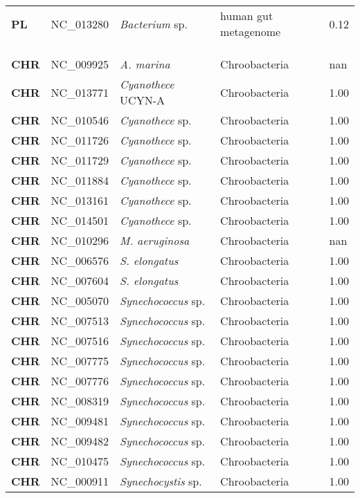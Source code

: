 \begin{adjustwidth}{-3cm}{2cm}
{\begin{supertabular}{>{\bfseries}l|p{0.1\textwidth}p{0.14\textwidth}l|l}
PL & NC\_013280 & \textit{Bacterium} sp. & human gut metagenome & 0.12\\
\\
\\
\hline\\
CHR & NC\_009925 & \textit{A. marina} & Chroobacteria & nan\\
CHR & NC\_013771 & \textit{Cyanothece} UCYN-A & Chroobacteria & 1.00\\
CHR & NC\_010546 & \textit{Cyanothece} sp. & Chroobacteria & 1.00\\
CHR & NC\_011726 & \textit{Cyanothece} sp. & Chroobacteria & 1.00\\
CHR & NC\_011729 & \textit{Cyanothece} sp. & Chroobacteria & 1.00\\
CHR & NC\_011884 & \textit{Cyanothece} sp. & Chroobacteria & 1.00\\
CHR & NC\_013161 & \textit{Cyanothece} sp. & Chroobacteria & 1.00\\
CHR & NC\_014501 & \textit{Cyanothece} sp. & Chroobacteria & 1.00\\
CHR & NC\_010296 & \textit{M. aeruginosa} & Chroobacteria & nan\\
CHR & NC\_006576 & \textit{S. elongatus} & Chroobacteria & 1.00\\
CHR & NC\_007604 & \textit{S. elongatus} & Chroobacteria & 1.00\\
CHR & NC\_005070 & \textit{Synechococcus} sp. & Chroobacteria & 1.00\\
CHR & NC\_007513 & \textit{Synechococcus} sp. & Chroobacteria & 1.00\\
CHR & NC\_007516 & \textit{Synechococcus} sp. & Chroobacteria & 1.00\\
CHR & NC\_007775 & \textit{Synechococcus} sp. & Chroobacteria & 1.00\\
CHR & NC\_007776 & \textit{Synechococcus} sp. & Chroobacteria & 1.00\\
CHR & NC\_008319 & \textit{Synechococcus} sp. & Chroobacteria & 1.00\\
CHR & NC\_009481 & \textit{Synechococcus} sp. & Chroobacteria & 1.00\\
CHR & NC\_009482 & \textit{Synechococcus} sp. & Chroobacteria & 1.00\\
CHR & NC\_010475 & \textit{Synechococcus} sp. & Chroobacteria & 1.00\\
CHR & NC\_000911 & \textit{Synechocystis} sp. & Chroobacteria & 1.00\\

\end{supertabular}}
\end{adjustwidth}
